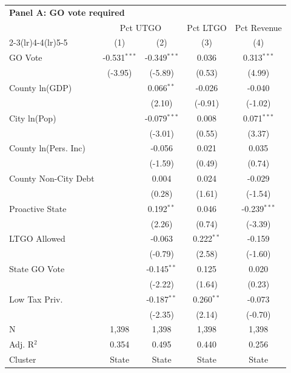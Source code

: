 \begingroup
\centering
\begin{tabular*}{\textwidth}{@{\extracolsep{\fill}}lcccc}
\multicolumn{5}{l}{\textbf{Panel A: GO vote required}}\\

\addlinespace
   \toprule
    & \multicolumn{2}{c}{Pct UTGO} & Pct LTGO & Pct Revenue\\
   \cmidrule(lr){2-3}\cmidrule(lr){4-4}\cmidrule(lr){5-5}
                        & (1)            & (2)            & (3)          & (4)\\  
   \midrule 
   GO Vote              & -0.531$^{***}$ & -0.349$^{***}$ & 0.036        & 0.313$^{***}$\\   
                        & (-3.95)       & (-5.89)       & (0.53)      & (4.99)\\   
   County ln(GDP)       &                & 0.066$^{**}$   & -0.026       & -0.040\\   
                        &                & (2.10)        & (-0.91)     & (-1.02)\\   
   City ln(Pop)         &                & -0.079$^{***}$ & 0.008        & 0.071$^{***}$\\   
                        &                & (-3.01)       & (0.55)      & (3.37)\\   
   County ln(Pers. Inc) &                & -0.056         & 0.021        & 0.035\\   
                        &                & (-1.59)       & (0.49)      & (0.74)\\   
   County Non-City Debt &                & 0.004          & 0.024        & -0.029\\   
                        &                & (0.28)        & (1.61)      & (-1.54)\\   
   Proactive State      &                & 0.192$^{**}$   & 0.046        & -0.239$^{***}$\\   
                        &                & (2.26)        & (0.74)      & (-3.39)\\   
   LTGO Allowed         &                & -0.063         & 0.222$^{**}$ & -0.159\\   
                        &                & (-0.79)       & (2.58)      & (-1.60)\\   
   State GO Vote        &                & -0.145$^{**}$  & 0.125        & 0.020\\   
                        &                & (-2.22)       & (1.64)      & (0.23)\\   
   Low Tax Priv.        &                & -0.187$^{**}$  & 0.260$^{**}$ & -0.073\\   
                        &                & (-2.35)       & (2.14)      & (-0.70)\\   
   \hline
   N         & 1,398          & 1,398          & 1,398        & 1,398\\  
   Adj. R$^2$       & 0.354          & 0.495          & 0.440        & 0.256\\  
   Cluster              & State & State & State & State\\  
   \bottomrule
\end{tabular*}
\par\endgroup

